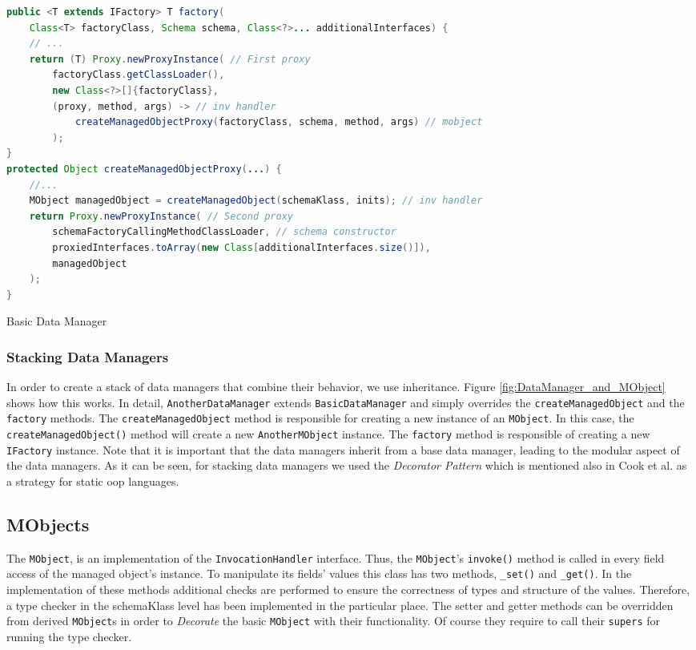 \begin{sourcecode} [H]
	\begin{lstlisting}[language=Java, escapechar=|]
public <T extends IFactory> T factory(
	Class<T> factoryClass, Schema schema, Class<?>... additionalInterfaces) {
	// ...
	return (T) Proxy.newProxyInstance( // First proxy
		factoryClass.getClassLoader(),
		new Class<?>[]{factoryClass},
		(proxy, method, args) -> // inv handler
			createManagedObjectProxy(factoryClass, schema, method, args) // mobject
		);
}
protected Object createManagedObjectProxy(...) {
	//...
	MObject managedObject = createManagedObject(schemaKlass, inits); // inv handler
	return Proxy.newProxyInstance( // Second proxy
		schemaFactoryCallingMethodClassLoader, // schema constructor
		proxiedInterfaces.toArray(new Class[additionalInterfaces.size()]),
		managedObject
	);
}
\end{lstlisting}
	\caption{Basic Data Manager}
	\label{lst:Basic Data Manager}
\end{sourcecode}

\subsubsection{Stacking Data Managers}
In order to create a stack of data managers that combine their behavior, we use inheritance.
Figure \ref{fig:DataManager_and_MObject} shows how this works.
In detail, \texttt{AnotherDataManager} extends \texttt{BasicDataManager} and simply overrides the \texttt{createManagedObject} and the \texttt{factory} methods.
The \texttt{createManagedObject} method is responsible for creating a new instance of an \texttt{MObject}.
In this case, the \texttt{createManagedObject()} method will create a new \texttt{AnotherMObject} instance.
The \texttt{factory} method is responsible of creating a new \texttt{IFactory} instance.
Note that it is important that the data managers inherit from a base data manager, leading to the modular aspect of the data managers.
As it can be seen, for stacking data managers we used the \textit{Decorator Pattern} \cite{gamma1995design} which is mentioned also in Cook et al. \cite{loh2012managed} as a strategy for static \ac{oop} languages.

\subsection{MObjects}\label{sec:Managed Objects}
The \texttt{MObject}, is an implementation of the \texttt{InvocationHandler} interface.
Thus, the \texttt{MObject}'s \texttt{invoke()} method is called in every field access of the managed object's instance.
To manipulate its fields' values this class has two methods, \texttt{\_set()} and \texttt{\_get()}.
In the implementation of these methods additional checks are performed to ensure the correctness of types and structure of the values.
Therefore, a type checker in the schemaKlass level has been implemented in the particular place.
The setter and getter methods can be overridden from derived \texttt{MObject}s in order to \textit{Decorate} the basic \texttt{MObject} with their functionality. 
Of course they require to call their \texttt{supers} for running the type checker.

